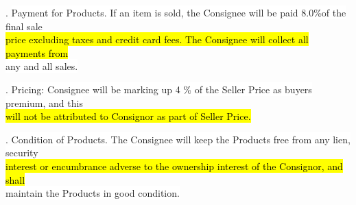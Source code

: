 \documentclass[12pt]{article}%
\begin{document}
. \colorbox{white}{Payment for Products. If an item is sold, the Consignee will be paid 8.0\%of the final sale }\\
\hl{price excluding taxes and credit card fees. The Consignee will collect all payments from }\\
\colorbox{white}{any and all sales.}

. \colorbox{white}{Pricing: Consignee will be marking up 4 \% of the Seller Price as buyers premium, and this} \\
\hl{will not be attributed to Consignor as part of Seller Price.}

. \colorbox{white}{Condition of Products. The Consignee will keep the Products free from any lien, security }\\
\hl{interest or encumbrance adverse to the ownership interest of the Consignor, and shall}\\
\colorbox{white}{maintain the Products in good condition.}
\end{document}
